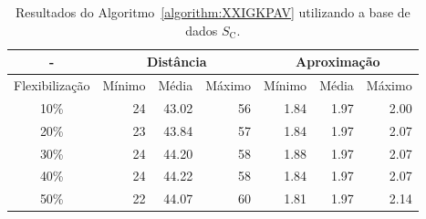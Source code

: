 \begin{table}[!htb]
  \caption{Resultados do Algoritmo~\ref{algorithm:XXIGKPAV} utilizando a base de dados $S_{\text{C}}$.}
  \label{table:JXNBJWFA}
  \centering
  \begin{tabular}{|c|r|r|r|r|r|r|}
    \hline
      -            & \multicolumn{3}{c|}{Distância}             & \multicolumn{3}{c|}{Aproximação}           \\ \hline
    Flexibilização & Mínimo       & Média        & Máximo       & Mínimo       & Média        & Máximo       \\ \hline  
    10\%           & 24           & 43.02        & 56           & 1.84         & 1.97         & 2.00         \\ \hline
    20\%           & 23           & 43.84        & 57           & 1.84         & 1.97         & 2.07         \\ \hline
    30\%           & 24           & 44.20        & 58           & 1.88         & 1.97         & 2.07         \\ \hline
    40\%           & 24           & 44.22        & 58           & 1.84         & 1.97         & 2.07         \\ \hline
    50\%           & 22           & 44.07        & 60           & 1.81         & 1.97         & 2.14         \\ \hline    
  \end{tabular}
\end{table}